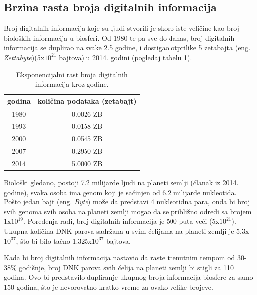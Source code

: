\documentclass[a4paper]{article}
\begin{document}
\subsection{Brzina rasta broja digitalnih informacija}
\label{subsec:broj_digitalnih_informacija_}

\hfill

Broj digitalnih informacija koje su ljudi stvorili je skoro iste veličine kao broj bioloških informacija u biosferi. Od 1980-te pa sve do danas, broj digitalnih informacija se duplirao na svake 2.5 godine, i dostigao otprilike 5 zetabajta (eng. \textit{Zettabyte})(5x$10^{21}$ bajtova) u 2014. godini (pogledaj tabelu \ref{tab:tabela1}).

\begin{table}[h!]
\begin{center}
\begin{tabular}{|c|c|} \hline
\textbf{godina}& \textbf{količina podataka (zetabajt)}\\ \hline
1980 &0.0026 ZB\\ \hline
1993 &0.0158 ZB\\ \hline
2000 &0.0545 ZB\\ \hline
2007 &0.2950 ZB\\ \hline
2014 &5.0000 ZB\\ \hline
\end{tabular}
\caption{Eksponencijalni rast broja digitalnih informacija kroz godine.}
\label{tab:tabela1}
\end{center}
\end{table}

Biološki gledano, postoji 7.2 milijarde ljudi na planeti zemlji (članak iz 2014. godine), svaka osoba ima genom koji je sačinjen od 6.2 milijarde nukleotida. Pošto jedan bajt (eng. \textit{Byte}) može da predstavi 4 nukleotidna para, onda bi broj svih genoma svih osoba na planeti zemlji mogao da se približno odredi sa brojem 1x$10^{19}$. Poređenja radi, broj digitalnih informacija je 500 puta veći (5x$10^{21}$). Ukupna količina DNK parova sadržana u svim ćelijama na planeti zemlji je 5.3x$10^{37}$, što bi bilo tačno 1.325x$10^{37}$ bajtova.

Kada bi broj digitalnih informacija nastavio da raste trenutnim tempom od 30-38\% godišnje, broj DNK parova svih ćelija na planeti zemlji bi stigli za 110 godina. Ovo bi predstavilo dupliranje ukupnog broja informacija biosfere za samo 150 godina, što je nevorovatno kratko vreme za ovako velike brojeve.\cite{r6}
\end{document}
